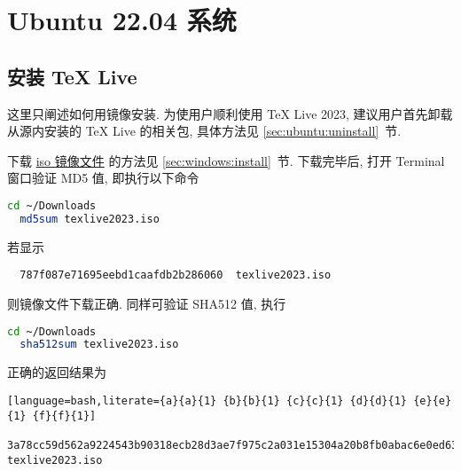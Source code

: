 
\chapter{Ubuntu 22.04 系统}

\section{安装 \TeX{} Live}

这里只阐述如何用镜像安装.
为使用户顺利使用 \TeX{} Live 2023,
建议用户首先卸载从源内安装的 \TeX{} Live 的相关包,
具体方法见 \ref{sec:ubuntu:uninstall}~节.

下载
\href{https://mirrors.ctan.org/systems/texlive/Images/texlive2023.iso}{iso 镜像文件}
的方法见 \ref{sec:windows:install}~节.
下载完毕后, 打开 \textsf{Terminal} 窗口验证 MD5 值,
即执行以下命令
\begin{lstlisting}[language = bash]
  cd ~/Downloads
  md5sum texlive2023.iso
\end{lstlisting}
若显示
\begin{lstlisting}
  787f087e71695eebd1caafdb2b286060  texlive2023.iso
\end{lstlisting}
则镜像文件下载正确.
同样可验证 SHA512 值,
执行
\begin{lstlisting}[language = bash]
  cd ~/Downloads
  sha512sum texlive2023.iso
\end{lstlisting}
正确的返回结果为
\begin{lstlisting}[language=bash,literate={a}{a}{1} {b}{b}{1} {c}{c}{1} {d}{d}{1} {e}{e}{1} {f}{f}{1}]
  3a78cc59d562a9224543b90318ecb28d3ae7f975c2a031e15304a20b8fb0abac6e0ed63012c0bdf8f5edd39380caf122a17c948c05b28ea38fe90f2f0b19bdba  texlive2023.iso
\end{lstlisting}


